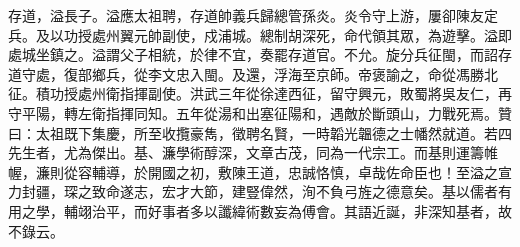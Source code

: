 \begin{pinyinscope}
存道，溢長子。溢應太祖聘，存道帥義兵歸總管孫炎。炎令守上游，屢卻陳友定兵。及以功授處州翼元帥副使，戍浦城。總制胡深死，命代領其眾，為遊擊。溢即處城坐鎮之。溢謂父子相統，於律不宜，奏罷存道官。不允。旋分兵征閩，而詔存道守處，復部鄉兵，從李文忠入閩。及還，浮海至京師。帝褒諭之，命從馮勝北征。積功授處州衛指揮副使。洪武三年從徐達西征，留守興元，敗蜀將吳友仁，再守平陽，轉左衛指揮同知。五年從湯和出塞征陽和，遇敵於斷頭山，力戰死焉。贊曰：太祖既下集慶，所至收攬豪雋，徵聘名賢，一時韜光韞德之士幡然就道。若四先生者，尤為傑出。基、濂學術醇深，文章古茂，同為一代宗工。而基則運籌帷幄，濂則從容輔導，於開國之初，敷陳王道，忠誠恪慎，卓哉佐命臣也！至溢之宣力封疆，琛之致命遂志，宏才大節，建豎偉然，洵不負弓旌之德意矣。基以儒者有用之學，輔翊治平，而好事者多以讖緯術數妄為傅會。其語近誕，非深知基者，故不錄云。


\end{pinyinscope}